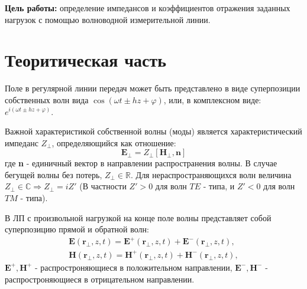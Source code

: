 



\def\labauthors{Виноградов И.Д., Шиков А.П.}
\def\labgroup{430}
\def\labnumber{2}
\def\labtheme{Измерение импедансов и коэффициентов отражения}


\newpage

{\bfseries Цель работы:} 
определение импедансов и коэффициентов отражения заданных нагрузок с помощью волноводной измерительной линии.

\section{Теоритическая часть}

Поле в регулярной линии передач может быть представлено в виде суперпозиции собственных волн вида $ \cos (\omega t \pm h
z + \varphi) $, или, в комплексном виде: $e^{ i ( \omega t \pm h z +\varphi ) }$. 

Важной характеристикой собственной волны (моды) является характеристический импеданс $Z_{\bot}$, определяющийся как отношение:
\begin{equation}
     \textbf{E}_{\bot} = Z_{\bot}[ \textbf{H}_{\bot},\textbf{n} ]
    \label{eq:1}
\end{equation}
где \textbf{n} - единичный вектор в направлении распространения волны. В случае бегущей волны без потерь, $Z_{\bot} \in
\mathds{R} $. Для нераспространяющихся волн величина $Z_{\bot} \in \mathds{C} \Rightarrow Z_{\bot} = iZ'$ (В частности
$Z'>0$ для волн $TE$ - типа, и $Z'<0$ для волн $TM$ - типа). 

В ЛП с произвольной нагрузкой на конце поле волны представляет собой суперпозицию прямой и обратной волн:
\begin{equation}
    \begin{split}
        \textbf{E}(\textbf{r}_{\bot},z,t) = \textbf{E}^+(\textbf{r}_{\bot},z,t)+\textbf{E}^-(\textbf{r}_{\bot},z,t),\\
        \textbf{H}(\textbf{r}_{\bot},z,t) = \textbf{H}^+(\textbf{r}_{\bot},z,t)+\textbf{H}^-(\textbf{r}_{\bot},z,t),  
    \end{split}
    \label{eq:2}
\end{equation}
$\textbf{E}^+,\textbf{H}^+$ - распростроняющиеся в положительном направлении, $\textbf{E}^-,\textbf{H}^-$ -
распростроняющиеся в отрицательном направлении.


